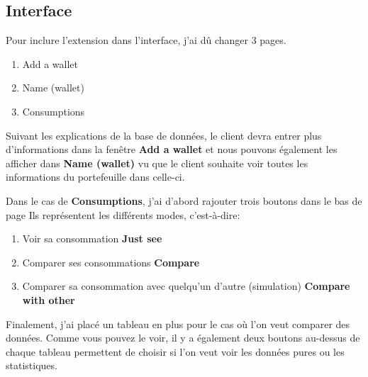 \subsection{Interface}

\begin{flushleft}
Pour inclure l'extension dans l'interface, j'ai dû changer 3 pages.
\end{flushleft}

\begin{enumerate}[-]
\item Add a wallet
\item Name (wallet)
\item Consumptions
\end{enumerate}

\begin{flushleft}
Suivant les explications de la base de données, le client devra entrer plus d'informations dans la fenêtre \textbf{Add a wallet} et nous pouvons également les afficher dans \textbf{Name (wallet)} vu que le client souhaite voir toutes les informations du portefeuille dans celle-ci.
\end{flushleft}

\begin{flushleft}
Dans le cas de \textbf{Consumptions}, j'ai d'abord rajouter trois boutons dans le bas de page Ils représentent les différents modes, c'est-à-dire:
\end{flushleft}

\begin{enumerate}[-]
\item Voir sa consommation \textbf{Just see}
\item Comparer ses consommations \textbf{Compare}
\item Comparer sa consommation avec quelqu'un d'autre (simulation) \textbf{Compare with other}
\end{enumerate}

\begin{flushleft}
Finalement, j'ai placé un tableau en plus pour le cas où l'on veut comparer des données. Comme vous pouvez le voir, il y a également deux boutons au-dessus de chaque tableau permettent de choisir si l'on veut voir les données pures ou les statistiques.
\end{flushleft}


